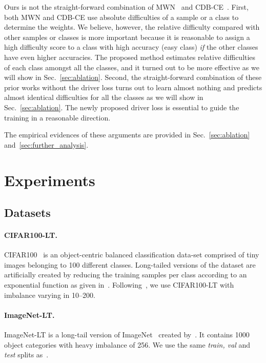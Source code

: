 \documentclass[10pt,twocolumn,letterpaper]{article}
\begin{document}
Ours is not the straight-forward combination of MWN~\cite{meta-weight-net} and CDB-CE~\cite{cdb-ce}.
First, both MWN and CDB-CE use absolute difficulties of a sample or a class to determine the weights. 
We believe, however, the relative difficulty compared with other samples or classes is more important because it is reasonable to assign a high difficulty score to a class with high accuracy (\ie easy class) {\it if} the other classes have even higher accuracies. 
The proposed method estimates relative difficulties of each class amongst all the classes, and it turned out to be more effective as we will show in Sec.~\ref{sec:ablation}.
Second, the straight-forward combination of these prior works without the driver loss turns out to learn almost nothing and predicts almost identical difficulties for all the classes as we will show in Sec.~\ref{sec:ablation}. 
The newly proposed driver loss is essential to guide the training in a reasonable direction.

The empirical evidences of these arguments are provided in Sec.~\ref{sec:ablation} and~\ref{sec:further_analysis}.


\section{Experiments}
\subsection{Datasets}


\paragraph{\bf CIFAR100-LT.} 
CIFAR100~\cite{CIFAR} is an object-centric balanced classification data-set comprised of tiny images belonging to 100 different classes. Long-tailed versions of the dataset are artificially created by reducing the training samples per class according to an exponential function as given in~\cite{classbalancedloss}. Following~\cite{classbalancedloss}, we use CIFAR100-LT with imbalance varying in 10--200. 
\vspace{-11pt}
\paragraph{\bf ImageNet-LT.} 
ImageNet-LT is a long-tail version of ImageNet~\cite{imagenet} created by~\cite{oltr}. It contains 1000 object categories with heavy imbalance of 256.
We use the same \textit{train, val} and \textit{ test} splits as~\cite{oltr}. 
\vspace{-11pt}
\end{document}
